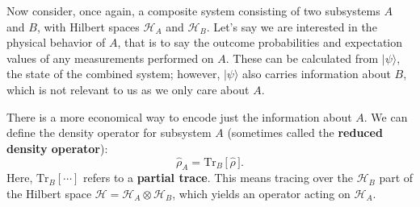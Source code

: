 \documentclass[pra,12pt]{revtex4}
\begin{document}
Now consider, once again, a composite system consisting of two
subsystems $A$ and $B$, with Hilbert spaces $\mathscr{H}_A$ and
$\mathscr{H}_B$.  Let's say we are interested in the physical behavior
of $A$, that is to say the outcome probabilities and expectation
values of any measurements performed on $A$.  These can be calculated
from $|\psi\rangle$, the state of the combined system; however,
$|\psi\rangle$ also carries information about $B$, which is not
relevant to us as we only care about $A$.

There is a more economical way to encode just the information about
$A$.  We can define the density operator for subsystem $A$ (sometimes
called the \textbf{reduced density operator}):
\begin{equation}
  \hat{\rho}_A = \mathrm{Tr}_B \,\big[\,\hat{\rho}\,\big].
  \label{rhoa_def}
\end{equation}
Here, $\mathrm{Tr}_B[\cdots]$ refers to a \textbf{partial trace}.
This means tracing over the $\mathscr{H}_B$ part of the Hilbert space
$\mathscr{H} = \mathscr{H}_A \otimes \mathscr{H}_B$, which yields an
operator acting on $\mathscr{H}_A$.
\end{document}
